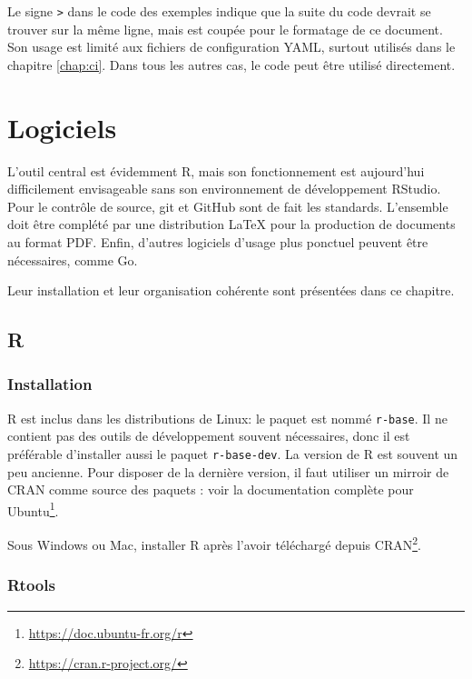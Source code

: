 \documentclass[
  11pt,
  french,
  a4paper,
  extrafontsizes,onecolumn,openright
  ]{memoir}
\begin{document}
Le signe \texttt{\textbar{}\textgreater{}} dans le code des exemples indique que la suite du code devrait se trouver sur la même ligne, mais est coupée pour le formatage de ce document.
Son usage est limité aux fichiers de configuration YAML, surtout utilisés dans le chapitre \ref{chap:ci}.
Dans tous les autres cas, le code peut être utilisé directement.

\mainmatter

\hypertarget{chap:logiciels}{%
\chapter{Logiciels}\label{chap:logiciels}}

L'outil central est évidemment R, mais son fonctionnement est aujourd'hui difficilement envisageable sans son environnement de développement RStudio.
Pour le contrôle de source, git et GitHub sont de fait les standards.
L'ensemble doit être complété par une distribution LaTeX pour la production de documents au format PDF.
Enfin, d'autres logiciels d'usage plus ponctuel peuvent être nécessaires, comme Go.

Leur installation et leur organisation cohérente sont présentées dans ce chapitre.

\hypertarget{r}{%
\section{R}\label{r}}

\hypertarget{installation}{%
\subsection{Installation}\label{installation}}

R est inclus dans les distributions de Linux: le paquet est nommé \texttt{r-base}.
Il ne contient pas des outils de développement souvent nécessaires, donc il est préférable d'installer aussi le paquet \texttt{r-base-dev}.
La version de R est souvent un peu ancienne.
Pour disposer de la dernière version, il faut utiliser un mirroir de CRAN comme source des paquets : voir la documentation complète pour Ubuntu\footnote{\url{https://doc.ubuntu-fr.org/r}}.

Sous Windows ou Mac, installer R après l'avoir téléchargé depuis CRAN\footnote{\url{https://cran.r-project.org/}}.

\hypertarget{rtools}{%
\subsection{Rtools}\label{rtools}}
\end{document}
